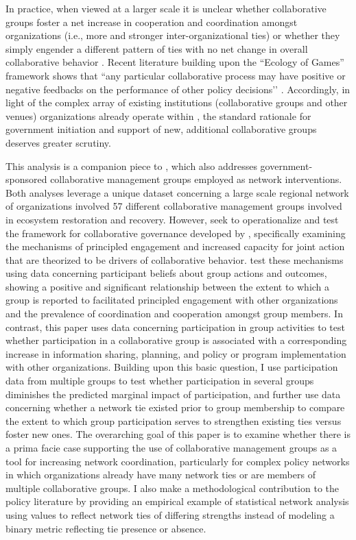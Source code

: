 \documentclass[12pt,a4paper,titlepage]{article}
\begin{document}
In practice, when viewed at a larger scale it is unclear whether collaborative groups foster a net increase in cooperation and coordination amongst organizations (i.e., more and stronger inter-organizational ties) or whether they simply engender a different pattern of ties with no net change in overall collaborative behavior \parencite{lubell2010,lubell2011}. Recent literature building upon the ``Ecology of Games'' framework \parencite{berardo2010,lubell2010,lubell2011, lubell2011-a, mcallister2014, smaldino2014, niles2012} shows that “any particular collaborative process may have positive or negative feedbacks on the performance of other policy decisions’’ \parencite[424]{gerlak2012}. Accordingly, in light of the complex array of existing institutions (collaborative groups and other venues) organizations already operate within \parencite[see][]{lubell2013, lubell2011-a}, the standard rationale for government initiation and support of new, additional collaborative groups deserves greater scrutiny.

This analysis is a companion piece to \textcite{scott2015}, which also addresses government-sponsored collaborative management groups employed as network interventions. Both analyses leverage a unique dataset concerning a large scale regional network of organizations involved 57 different collaborative management groups involved in ecosystem restoration and recovery. However, \textcite{scott2015} seek to operationalize and test the framework for collaborative governance developed by \textcite{emerson2012}, specifically examining the mechanisms of principled engagement and increased capacity for joint action that are theorized to be drivers of collaborative behavior. \textcite{scott2015} test these mechanisms using data concerning participant beliefs about group actions and outcomes, showing a positive and significant relationship between the extent to which a group is reported to facilitated principled engagement with other organizations and the prevalence of coordination and cooperation amongst group members. In contrast, this paper uses data concerning participation in group activities to test whether participation in a collaborative group is associated with a corresponding increase in information sharing, planning, and policy or program implementation with other organizations. Building upon this basic question, I use participation data from multiple groups to test whether participation in several groups diminishes the predicted marginal impact of participation, and further use data concerning whether a network tie existed prior to group membership to compare the extent to which group participation serves to strengthen existing ties versus foster new ones. The overarching goal of this paper is to examine whether there is a prima facie case supporting the use of collaborative management groups as a tool for increasing network coordination, particularly for complex policy networks in which organizations already have many network ties or are members of multiple collaborative groups. I also make a methodological contribution to the policy literature by providing an empirical example of statistical network analysis using values to reflect network ties of differing strengths instead of modeling a binary metric reflecting tie presence or absence.
\end{document}
